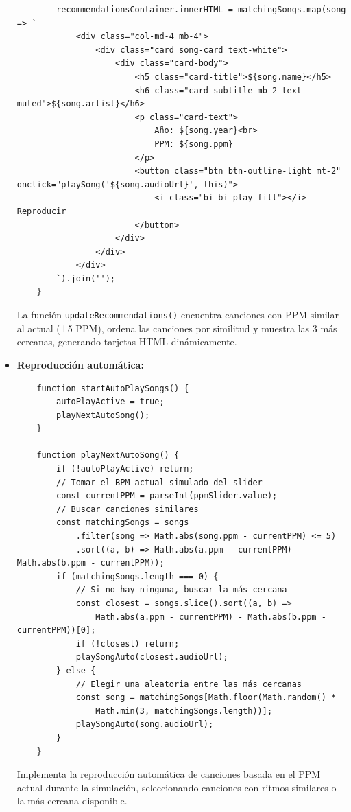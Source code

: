 \documentclass[a4paper,12pt]{article}
\begin{document}
\begin{itemize}
\begin{verbatim}
        recommendationsContainer.innerHTML = matchingSongs.map(song => `
            <div class="col-md-4 mb-4">
                <div class="card song-card text-white">
                    <div class="card-body">
                        <h5 class="card-title">${song.name}</h5>
                        <h6 class="card-subtitle mb-2 text-muted">${song.artist}</h6>
                        <p class="card-text">
                            Año: ${song.year}<br>
                            PPM: ${song.ppm}
                        </p>
                        <button class="btn btn-outline-light mt-2" onclick="playSong('${song.audioUrl}', this)">
                            <i class="bi bi-play-fill"></i> Reproducir
                        </button>
                    </div>
                </div>
            </div>
        `).join('');
    }
    \end{verbatim}
    La función \texttt{updateRecommendations()} encuentra canciones con PPM similar al actual (±5 PPM), ordena las canciones por similitud y muestra las 3 más cercanas, generando tarjetas HTML dinámicamente.

    \item \textbf{Reproducción automática:}
    \begin{verbatim}
    function startAutoPlaySongs() {
        autoPlayActive = true;
        playNextAutoSong();
    }

    function playNextAutoSong() {
        if (!autoPlayActive) return;
        // Tomar el BPM actual simulado del slider
        const currentPPM = parseInt(ppmSlider.value);
        // Buscar canciones similares
        const matchingSongs = songs
            .filter(song => Math.abs(song.ppm - currentPPM) <= 5)
            .sort((a, b) => Math.abs(a.ppm - currentPPM) - Math.abs(b.ppm - currentPPM));
        if (matchingSongs.length === 0) {
            // Si no hay ninguna, buscar la más cercana
            const closest = songs.slice().sort((a, b) => 
                Math.abs(a.ppm - currentPPM) - Math.abs(b.ppm - currentPPM))[0];
            if (!closest) return;
            playSongAuto(closest.audioUrl);
        } else {
            // Elegir una aleatoria entre las más cercanas
            const song = matchingSongs[Math.floor(Math.random() * 
                Math.min(3, matchingSongs.length))];
            playSongAuto(song.audioUrl);
        }
    }
    \end{verbatim}
    Implementa la reproducción automática de canciones basada en el PPM actual durante la simulación, seleccionando canciones con ritmos similares o la más cercana disponible.


\end{itemize}
\end{document}
